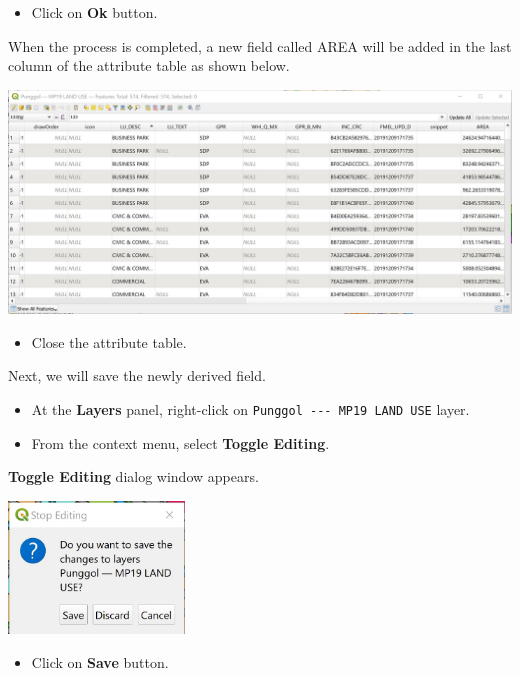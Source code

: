 \documentclass[
  letterpaper,
  DIV=11,
  numbers=noendperiod]{scrreprt}
\providecommand{\tightlist}{%
  \setlength{\itemsep}{0pt}\setlength{\parskip}{0pt}}\usepackage{longtable,booktabs,array}
\begin{document}
\begin{itemize}
\tightlist
\item
  Click on \textbf{Ok} button.
\end{itemize}

When the process is completed, a new field called AREA will be added in
the last column of the attribute table as shown below.

\includegraphics{./img04/image38.jpg}

\begin{itemize}
\tightlist
\item
  Close the attribute table.
\end{itemize}

Next, we will save the newly derived field.

\begin{itemize}
\item
  At the \textbf{Layers} panel, right-click on
  \texttt{Punggol\ -\/-\/-\ MP19\ LAND\ USE} layer.
\item
  From the context menu, select \textbf{Toggle Editing}.
\end{itemize}

\textbf{Toggle Editing} dialog window appears.

\includegraphics[width=1.84375in,height=\textheight]{./img04/image39.jpg}

\begin{itemize}
\tightlist
\item
  Click on \textbf{Save} button.
\end{itemize}
\end{document}
